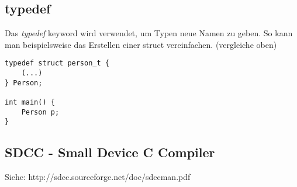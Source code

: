 \documentclass[11pt,a4paper]{article}
\begin{document}
\subsection{typedef}
Das \textit{typedef} keyword wird verwendet, um Typen neue Namen zu geben. So kann man beispielsweise das Erstellen einer struct vereinfachen. (vergleiche oben)
\begin{verbatim}
typedef struct person_t {
    (...)
} Person;

int main() {
    Person p;
}
\end{verbatim}

\subsection{SDCC - Small Device C Compiler}

Siehe: http://sdcc.sourceforge.net/doc/sdccman.pdf
\end{document}
